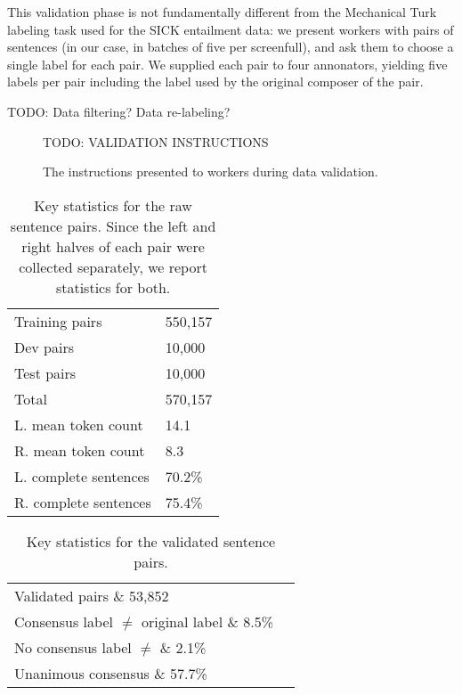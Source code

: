 This validation phase is not fundamentally different from the Mechanical Turk labeling task used for the SICK entailment data: we present workers with pairs of sentences (in our case, in batches of five per screenfull), and ask them to choose a single label for each pair. We supplied each pair to four annonators, yielding five labels per pair including the label used by the original composer of the pair. 

TODO: Data filtering? Data re-labeling?

\begin{figure}
\footnotesize
TODO: VALIDATION INSTRUCTIONS

\caption{\label{instructions-2}The instructions presented to workers during data validation.}
\end{figure}

\begin{table}
\center
  \begin{tabular}{l l} 
    \toprule
Training pairs &  550,157\\
Dev pairs &  10,000\\
Test pairs &  10,000\\
Total & 570,157\\
\midrule
L. mean token count & 14.1\\
R. mean token count & 8.3 \\
\midrule
L. complete sentences & 70.2\%\\
R. complete sentences & 75.4\%\\
    \bottomrule
  \end{tabular}
\caption{\label{b-table}Key statistics for the raw sentence pairs. Since the left and right halves of each pair were collected separately, we report statistics for both.} 
\end{table}


\begin{table}
\center
  \begin{tabular}{l l} 
    \toprule
Validated pairs \& 53,852\\
Consensus label $\ne$ original label \& 8.5\%\\
No consensus label $\ne$ \& 2.1\%\\
Unanimous consensus \& 57.7\%\\
    \bottomrule
  \end{tabular}
\caption{\label{b-table}Key statistics for the validated sentence pairs.} 
\end{table}


